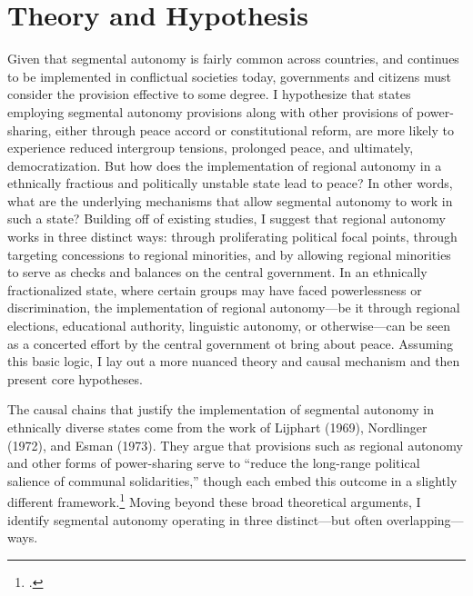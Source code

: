 \documentclass[12pt]{article}
\begin{document}
\section{Theory and Hypothesis}
Given that segmental autonomy is fairly common across countries, and continues to be implemented in conflictual societies today, governments and citizens must consider the provision effective to some degree. I hypothesize that states employing segmental autonomy provisions along with other provisions of power-sharing, either through peace accord or constitutional reform, are more likely to experience reduced intergroup tensions, prolonged peace, and ultimately, democratization. But how does the implementation of regional autonomy in a ethnically fractious and politically unstable state lead to peace? In other words, what are the underlying mechanisms that allow segmental autonomy to work in such a state? Building off of existing studies, I suggest that regional autonomy works in three distinct ways: through proliferating political focal points, through targeting concessions to regional minorities, and by allowing regional minorities to serve as checks and balances on the central government. In an ethnically fractionalized state, where certain groups may have faced powerlessness or discrimination, the implementation of regional autonomy---be it through regional elections, educational authority, linguistic autonomy, or otherwise---can be seen as a concerted effort by the central government ot bring about peace. Assuming this basic logic, I lay out a more nuanced theory and causal mechanism and then present core hypotheses. 

The causal chains that justify the implementation of segmental autonomy in ethnically diverse states come from the work of Lijphart (1969), Nordlinger (1972), and Esman (1973). They argue that provisions such as regional autonomy and other forms of power-sharing serve to ``reduce the long-range political salience of communal solidarities,'' though each embed this outcome in a slightly different framework.\footcite[55]{esman_management_1973} Moving beyond these broad theoretical arguments, I identify segmental autonomy operating in three distinct---but often overlapping---ways. 
\end{document}

